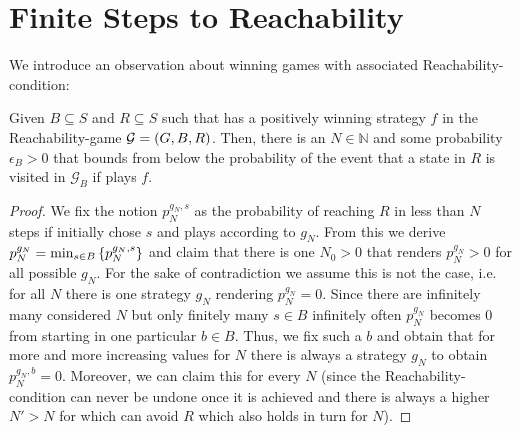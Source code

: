 \section{Finite Steps to Reachability}
We introduce an observation about winning games with associated 
Reachability-condition:
\begin{proposition}
  Given $B\subseteq S$ and $R\subseteq S$ such that \eve{} has a positively
  winning strategy $f$ in the Reachability-game $\mathcal{G}=\left(G, B, R\right)$.
  Then, there is an $N\in\mathbb{N}$ and some probability $\epsilon_{B} > 0$ 
  that bounds from below the probability of the event that a state in $R$ is 
  visited in $\mathcal{G}_{B}$ if \eve{} plays $f$.
  \label{prop:FiniteSteps}
\end{proposition}
\begin{proof}
  We fix the notion $p_{N}^{g_{N}, s}$ as the probability of reaching $R$ in 
  less than $N$ steps if \adam{} initially chose $s$ and plays according to 
  $g_{N}$. From this we derive $p_{N}^{g_{N}} = 
  \min_{s\in B}\left\{p_{N}^{g_{N}, s}\right\}$ and claim that there is one 
  $N_{0} > 0$ that renders $p_{N}^{g_{N}} > 0$ for all possible $g_{N}$. For 
  the sake of contradiction we assume this is not the case, i.e. for all $N$ 
  there is one strategy $g_{N}$ rendering $p_{N}^{g_{N}} = 0$. Since there 
  are infinitely many considered $N$ but only finitely many $s\in B$ 
  infinitely often $p_{N}^{g_{N}}$ becomes $0$ from starting in one 
  particular $b\in B$. Thus, we fix such a $b$ and obtain that for more and 
  more increasing values for $N$ there is always a strategy $g_{N}$ to obtain 
  $p_{N}^{g_{N}, b} = 0$. Moreover, we can claim this for every $N$ (since 
  the Reachability-condition can never be undone once it is achieved and 
  there is always a higher $N' > N$ for which \adam{} can avoid $R$ which 
  also holds in turn for $N$).


\end{proof}
